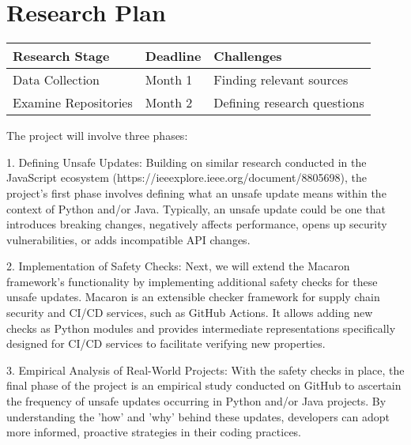 \section{Research Plan}


\begin{table}[h]
  \centering
  \begin{adjustbox}{max width=\columnwidth}
  \begin{tabular}{|p{3.2cm}|p{2.6cm}|p{2.6cm}|}
      \hline
      \textbf{Research Stage} & \textbf{Deadline} & \textbf{Challenges} \\
      \hline
      Data Collection & Month 1 & Finding relevant sources \\
      \hline
      Examine Repositories & Month 2 & Defining research questions \\
      \hline

  \end{tabular}
  \end{adjustbox}
\end{table}



The project will involve three phases:


1. Defining Unsafe Updates: Building on similar research conducted in the JavaScript 
ecosystem (https://ieeexplore.ieee.org/document/8805698), the project's first phase 
involves defining what an unsafe update means within the context of Python and/or Java. 
Typically, an unsafe update could be one that introduces breaking changes, 
negatively affects performance, opens up security vulnerabilities, 
or adds incompatible API changes.


2. Implementation of Safety Checks: Next, we will extend the Macaron framework's 
functionality by implementing additional safety checks for these unsafe updates.
Macaron is an extensible checker framework for supply chain security and CI/CD services,
such as GitHub Actions. It allows adding new checks as Python modules and provides 
intermediate representations specifically designed for CI/CD services to facilitate 
verifying new properties.


3. Empirical Analysis of Real-World Projects: With the safety checks in place, 
the final phase of the project is an empirical study conducted on GitHub to ascertain
the frequency of unsafe updates occurring in Python and/or Java projects.
By understanding the 'how' and 'why' behind these updates, developers can adopt more 
informed, proactive strategies in their coding practices.